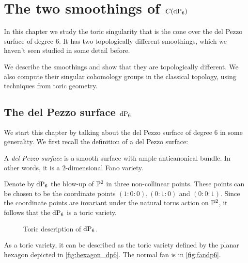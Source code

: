 \chapter{The two smoothings of \texorpdfstring{$C(\dP6)$}{C(dP6)}}
\label{chap:smoothings}

In this chapter we study the toric singularity that is the cone over the del Pezzo surface of degree $6$. It has two topologically different smoothings, which we haven't seen studied in some detail before.

We describe the smoothings and show that they are topologically different. We also compute their singular cohomology groups in the classical topology, using techniques from toric geometry.

\section{The del Pezzo surface \texorpdfstring{$\dP6$}{dP6}}
\label{sec:twosmoothings}

We start this chapter by talking about the del Pezzo surface of degree $6$ in some generality. We first recall the definition of a del Pezzo surface:

\begin{definition}
A \emph{del Pezzo surface} is a smooth surface with ample anticanonical bundle. In other words, it is a 2-dimensional Fano variety.
\end{definition}

Denote by $\dP6$ the blow-up of $\P^2$ in three non-collinear points.  These points can be chosen to be the coordinate points $(1:0:0),(0:1:0)$ and $(0:0:1)$. Since the coordinate points are invariant under the natural torus action on $\P^2$, it follows that the $\dP6$ is a toric variety.

\begin{figure}[b]
\centering 
\hspace*{\fill}
\hspace*{\fill}
\hspace*{\fill}
\caption{Toric description of $\dP6$.}
\end{figure}

As a toric variety, it can be described as the toric variety defined by the planar hexagon depicted in \cref{fig:hexagon_dp6}. The normal fan is in \cref{fig:fandp6}.

